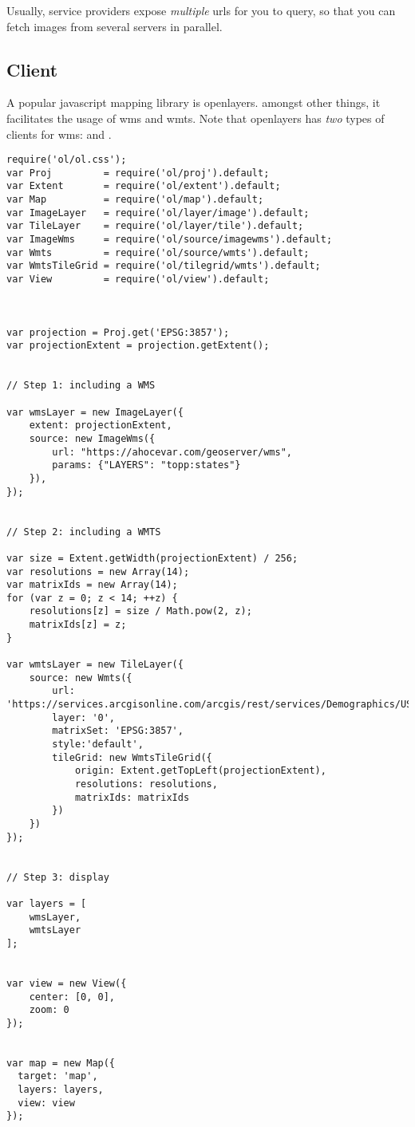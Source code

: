 Usually, service providers expose \emph{multiple} urls for you to query, so that you can fetch images from several servers in parallel. 

\subsection{Client}
A popular javascript mapping library is openlayers. amongst other things, it facilitates the usage of wms and wmts. Note that openlayers has \emph{two} types of clients for wms:  and .

\begin{lstlisting}
require('ol/ol.css');
var Proj         = require('ol/proj').default;
var Extent       = require('ol/extent').default;
var Map          = require('ol/map').default;
var ImageLayer   = require('ol/layer/image').default;
var TileLayer    = require('ol/layer/tile').default;
var ImageWms     = require('ol/source/imagewms').default;
var Wmts         = require('ol/source/wmts').default;
var WmtsTileGrid = require('ol/tilegrid/wmts').default;
var View         = require('ol/view').default;



var projection = Proj.get('EPSG:3857');
var projectionExtent = projection.getExtent();


// Step 1: including a WMS

var wmsLayer = new ImageLayer({
    extent: projectionExtent,
    source: new ImageWms({
        url: "https://ahocevar.com/geoserver/wms",
        params: {"LAYERS": "topp:states"}
    }),
});


// Step 2: including a WMTS

var size = Extent.getWidth(projectionExtent) / 256;
var resolutions = new Array(14);
var matrixIds = new Array(14);
for (var z = 0; z < 14; ++z) {
    resolutions[z] = size / Math.pow(2, z);
    matrixIds[z] = z;
}

var wmtsLayer = new TileLayer({
    source: new Wmts({
        url: 'https://services.arcgisonline.com/arcgis/rest/services/Demographics/USA_Population_Density/MapServer/WMTS/',
        layer: '0',
        matrixSet: 'EPSG:3857',
        style:'default',
        tileGrid: new WmtsTileGrid({
            origin: Extent.getTopLeft(projectionExtent),
            resolutions: resolutions,
            matrixIds: matrixIds
        })
    })
});


// Step 3: display

var layers = [
    wmsLayer,
    wmtsLayer
];


var view = new View({
    center: [0, 0],
    zoom: 0
});


var map = new Map({
  target: 'map',
  layers: layers,
  view: view
});

\end{lstlisting}
